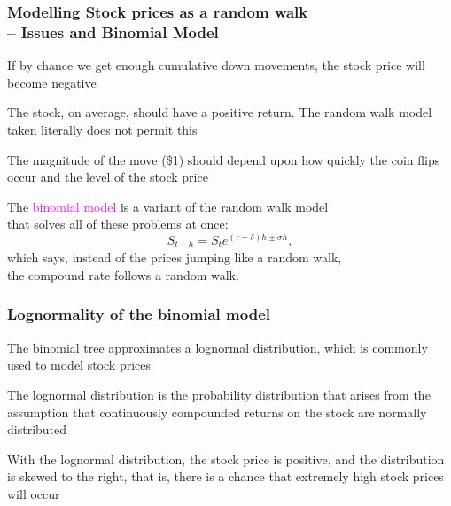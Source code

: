 \begin{frame}[fragile,t]
	\frametitle{Modelling Stock prices as a random walk \\ -- Issues and Binomial Model}
	\begin{center}

		If by chance we get enough cumulative down movements, the stock price will become negative
		\vfill

		The stock, on average, should have a positive return. The random walk model taken literally does not permit this
		\vfill

		The magnitude of the move (\$1) should depend upon how quickly the coin flips occur and the level of the stock price
		\vfill

		\mySeparateLine
		\bigskip

		The \textcolor{magenta}{binomial model} is a variant of the random walk model \\
		that solves all of these problems at once:
		\begin{equation*}
			S_{t+h} = S_t e^{(r-\delta)h \pm \sigma h},
		\end{equation*}
		which says, instead of the prices jumping like a random walk,\\
		the compound rate follows a random walk.
	\end{center}
\end{frame}
\begin{frame}[fragile,t]
	\frametitle{Lognormality of the binomial model}
	\begin{center}

		The binomial tree approximates a lognormal distribution, which is commonly used to model stock
		prices
		\vfill

		The lognormal distribution is the probability distribution that arises from the assumption that
		continuously compounded returns on the stock are normally distributed
		\vfill

		With the lognormal distribution, the stock price is positive, and the distribution is skewed to the
		right, that is, there is a chance that extremely high stock prices will occur

	\end{center}
\end{frame}
